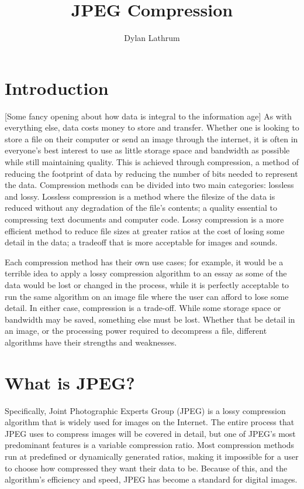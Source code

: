 \documentclass[11pt]{article}         %
\title{\vspace{-1.0cm}JPEG Compression}
\author{Dylan Lathrum}
\begin{document}
\maketitle

\section{Introduction}

[Some fancy opening about how data is integral to the information age]
As with everything else, data costs money to store and transfer.
Whether one is looking to store a file on their computer or send an image through the internet, it is often in everyone’s best interest to use as little storage space and bandwidth as possible while still maintaining quality.
This is achieved through compression, a method of reducing the footprint of data by reducing the number of bits needed to represent the data.
Compression methods can be divided into two main categories: lossless and lossy.
Lossless compression is a method where the filesize of the data is reduced without any degradation of the file’s contents; a quality essential to compressing text documents and computer code.
Lossy compression is a more efficient method to reduce file sizes at greater ratios at the cost of losing some detail in the data; a tradeoff that is more acceptable for images and sounds.

Each compression method has their own use cases; for example, it would be a terrible idea to apply a lossy compression algorithm to an essay as some of the data would be lost or changed in the process, while it is perfectly acceptable to run the same algorithm on an image file where the user can afford to lose some detail.
In either case, compression is a trade-off. While some storage space or bandwidth may be saved, something else must be lost.
Whether that be detail in an image, or the processing power required to decompress a file, different algorithms have their strengths and weaknesses.


\section{What is JPEG?}
\label{sec: whatisjpeg}

Specifically, Joint Photographic Experts Group (JPEG) is a lossy compression algorithm that is widely used for images on the Internet.
The entire process that JPEG uses to compress images will be covered in detail, but one of JPEG’s most predominant features is a variable compression ratio.
Most compression methods run at predefined or dynamically generated ratios, making it impossible for a user to choose how compressed they want their data to be.
Because of this, and the algorithm’s efficiency and speed, JPEG has become a standard for digital images.
\end{document}
